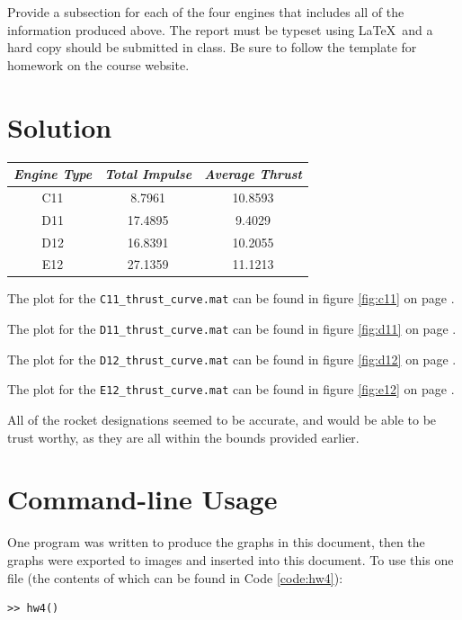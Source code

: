 \documentclass[11pt]{article}
\begin{document}
Provide a subsection for each of the four engines that includes all of the information produced above.  The report must be typeset using \LaTeX\ and a hard copy should be submitted in class.  Be sure to follow the template for homework on the course website.


\section{Solution}

\begin{center}
\begin{tabular}{c|c|c}
     \emph{Engine Type}&\emph{Total Impulse}&\emph{Average Thrust} \\
     \hline
     C11 &8.7961&10.8593\\
     D11 &17.4895&9.4029\\
     D12 &16.8391&10.2055\\
     E12 &27.1359&11.1213
\end{tabular}
\end{center}

The plot for the \texttt{C11\_thrust\_curve.mat} can be found in figure \ref{fig:c11} on page \pageref{fig:c11}.

The plot for the \texttt{D11\_thrust\_curve.mat} can be found in figure \ref{fig:d11} on page \pageref{fig:d11}.

The plot for the \texttt{D12\_thrust\_curve.mat} can be found in figure \ref{fig:d12} on page \pageref{fig:d12}.

The plot for the \texttt{E12\_thrust\_curve.mat} can be found in figure \ref{fig:e12} on page \pageref{fig:e12}.

\medskip

All of the rocket designations seemed to be accurate, and would be able to be trust worthy, as they are all within the bounds provided earlier.


\section{Command-line Usage}
One program was written to produce the graphs in this document, then the graphs were exported to images and inserted into this document. To use this one file (the contents of which can be found in Code \ref{code:hw4}): 

\begin{verbatim}
>> hw4()
\end{verbatim}
\end{document}
